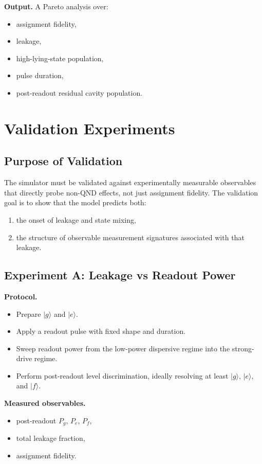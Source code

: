 \documentclass[11pt]{article}
\begin{document}
\textbf{Output.}
A Pareto analysis over:
\begin{itemize}[leftmargin=2em]
    \item assignment fidelity,
    \item leakage,
    \item high-lying-state population,
    \item pulse duration,
    \item post-readout residual cavity population.
\end{itemize}

\section{Validation Experiments}

\subsection{Purpose of Validation}

The simulator must be validated against experimentally measurable observables that directly
probe non-QND effects, not just assignment fidelity. The validation goal is to show that
the model predicts both:
\begin{enumerate}[leftmargin=2em]
    \item the onset of leakage and state mixing,
    \item the structure of observable measurement signatures associated with that leakage.
\end{enumerate}

\subsection{Experiment A: Leakage vs Readout Power}

\textbf{Protocol.}
\begin{itemize}[leftmargin=2em]
    \item Prepare $|g\rangle$ and $|e\rangle$.
    \item Apply a readout pulse with fixed shape and duration.
    \item Sweep readout power from the low-power dispersive regime into the strong-drive
    regime.
    \item Perform post-readout level discrimination, ideally resolving at least
    $|g\rangle$, $|e\rangle$, and $|f\rangle$.
\end{itemize}

\textbf{Measured observables.}
\begin{itemize}[leftmargin=2em]
    \item post-readout $P_g$, $P_e$, $P_f$,
    \item total leakage fraction,
    \item assignment fidelity.
\end{itemize}
\end{document}
